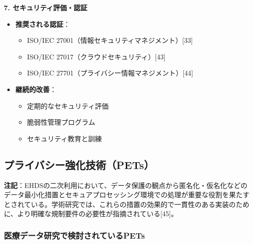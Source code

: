 \documentclass[
  a4paper,
  a4paper,
  11pt]{ltjsbook}
\providecommand{\tightlist}{%
  \setlength{\itemsep}{0pt}\setlength{\parskip}{0pt}}
\begin{document}
\textbf{7. セキュリティ評価・認証}

\begin{itemize}
\tightlist
\item
  \textbf{推奨される認証}：

  \begin{itemize}
  \tightlist
  \item
    ISO/IEC 27001（情報セキュリティマネジメント）{[}33{]}
  \item
    ISO/IEC 27017（クラウドセキュリティ）{[}43{]}
  \item
    ISO/IEC 27701（プライバシー情報マネジメント）{[}44{]}
  \end{itemize}
\item
  \textbf{継続的改善}：

  \begin{itemize}
  \tightlist
  \item
    定期的なセキュリティ評価
  \item
    脆弱性管理プログラム
  \item
    セキュリティ教育と訓練
  \end{itemize}
\end{itemize}

\subsection{プライバシー強化技術（PETs）}\label{ux30d7ux30e9ux30a4ux30d0ux30b7ux30fcux5f37ux5316ux6280ux8853pets}

\begin{tcolorbox}[enhanced jigsaw, toprule=.15mm, bottomtitle=1mm, coltitle=black, left=2mm, opacityback=0, arc=.35mm, colbacktitle=quarto-callout-note-color!10!white, colback=white, opacitybacktitle=0.6, bottomrule=.15mm, rightrule=.15mm, breakable, title=\textcolor{quarto-callout-note-color}{\faInfo}\hspace{0.5em}{Note}, toptitle=1mm, titlerule=0mm, colframe=quarto-callout-note-color-frame, leftrule=.75mm]

\textbf{注記}：EHDSの二次利用において、データ保護の観点から匿名化・仮名化などのデータ最小化措置とセキュアプロセッシング環境での処理が重要な役割を果たすとされている。学術研究では、これらの措置の効果的で一貫性のある実装のために、より明確な規制要件の必要性が指摘されている{[}45{]}。

\end{tcolorbox}

\subsubsection{医療データ研究で検討されているPETs}\label{ux533bux7642ux30c7ux30fcux30bfux7814ux7a76ux3067ux691cux8a0eux3055ux308cux3066ux3044ux308bpets}
\end{document}
